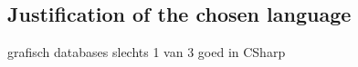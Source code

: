 \subsection{Justification of the chosen language}
grafisch
databases
slechts 1 van 3 goed in CSharp
